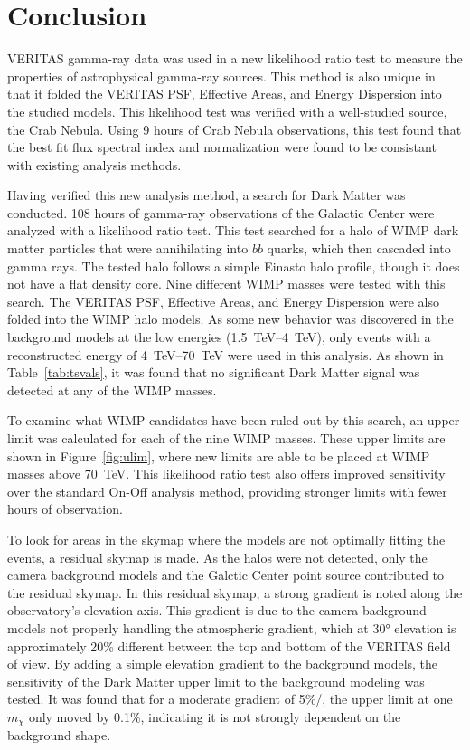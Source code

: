 \cleartooddpage[\thispagestyle{empty}]
\chapter{Conclusion}

VERITAS gamma-ray data was used in a new likelihood ratio test to measure the properties of astrophysical gamma-ray sources.
This method is also unique in that it folded the VERITAS PSF, Effective Areas, and Energy Dispersion into the studied models.
This likelihood test was verified with a well-studied source, the Crab Nebula.
Using 9 hours of Crab Nebula observations, this test found that the best fit flux spectral index and normalization were found to be consistant with existing analysis methods.

Having verified this new analysis method, a search for Dark Matter was conducted.
108 hours of gamma-ray observations of the Galactic Center were analyzed with a likelihood ratio test.
This test searched for a halo of WIMP dark matter particles that were annihilating into $b\bar{b}$ quarks, which then cascaded into gamma rays.
The tested halo follows a simple Einasto halo profile, though it does not have a flat density core.
Nine different WIMP masses were tested with this search.
The VERITAS PSF, Effective Areas, and Energy Dispersion were also folded into the WIMP halo models.
As some new behavior was discovered in the background models at the low energies (\SIrange{1.5}{4}{TeV}), only events with a reconstructed energy of \SIrange{4}{70}{TeV} were used in this analysis.
As shown in Table~\ref{tab:tsvals}, it was found that no significant Dark Matter signal was detected at any of the WIMP masses.

To examine what WIMP candidates have been ruled out by this search, an upper limit was calculated for each of the nine WIMP masses.
These upper limits are shown in Figure~\ref{fig:ulim}, where new limits are able to be placed at WIMP masses above \SI{70}{TeV}.
This likelihood ratio test also offers improved sensitivity over the standard On-Off analysis method, providing stronger limits with fewer hours of observation.

To look for areas in the skymap where the models are not optimally fitting the events, a residual skymap is made.
As the halos were not detected, only the camera background models and the Galctic Center point source contributed to the residual skymap.
In this residual skymap, a strong gradient is noted along the observatory's elevation axis.
This gradient is due to the camera background models not properly handling the atmospheric gradient, which at \ang{30} elevation is approximately \nicetilde{}20\% different between the top and bottom of the VERITAS field of view.
By adding a simple elevation gradient to the background models, the sensitivity of the Dark Matter upper limit to the background modeling was tested.
It was found that for a moderate gradient of 5\%/\degree{}, the upper limit at one $m_{\chi}$ only moved by 0.1\%, indicating it is not strongly dependent on the background shape.

